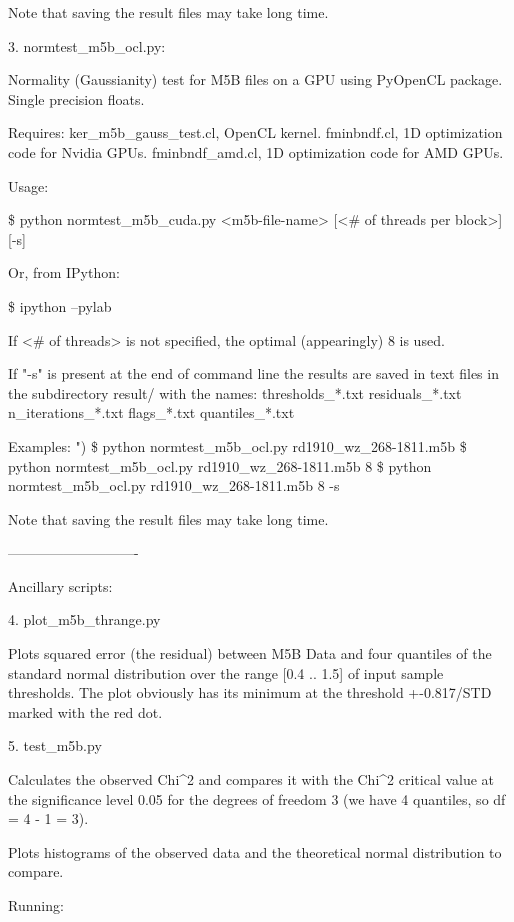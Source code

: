 \documentclass[letterpaper,twoside,12pt]{article}
\begin{document}
Note that saving the result files may take long time.




3. normtest_m5b_ocl.py:

Normality (Gaussianity) test for M5B files on a GPU using PyOpenCL package.
Single precision floats.

Requires:
ker_m5b_gauss_test.cl, OpenCL kernel.
fminbndf.cl, 1D optimization code for Nvidia GPUs.
fminbndf_amd.cl, 1D optimization code for AMD GPUs.

Usage: 

\$ python normtest_m5b_cuda.py <m5b-file-name> [<# of threads per block>] [-s]

Or, from IPython:

\$ ipython --pylab


If <# of threads> is not specified, the optimal (appearingly) 8 is used.

If "-s" is present at the end of command line the results are saved in text
files in the subdirectory result/ with the names:
   thresholds_*.txt
   residuals_*.txt
   n_iterations_*.txt
   flags_*.txt
   quantiles_*.txt

Examples:
")
\$ python normtest_m5b_ocl.py rd1910_wz_268-1811.m5b
\$ python normtest_m5b_ocl.py rd1910_wz_268-1811.m5b 8
\$ python normtest_m5b_ocl.py rd1910_wz_268-1811.m5b 8 -s

Note that saving the result files may take long time.


----------------------------

Ancillary scripts:

4. plot_m5b_thrange.py

Plots squared error (the residual) between M5B Data and four quantiles of the
standard normal distribution over the range [0.4 .. 1.5] of input sample
thresholds. The plot obviously has its minimum at the threshold +-0.817/STD
marked with the red dot.


5. test_m5b.py

Calculates the observed Chi^2 and compares it with the Chi^2 critical value at
the significance level 0.05 for the degrees of freedom 3 (we have 4 quantiles,
so df = 4 - 1 = 3).

Plots histograms of the observed data and the theoretical normal distribution
to compare.

Running:
\end{document}

